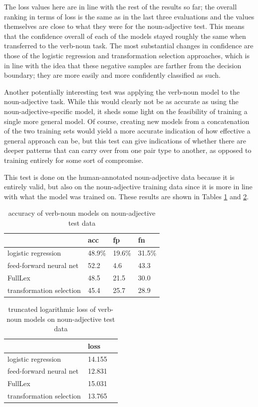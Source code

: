 \documentclass[a4paper, 12pt]{article}
\begin{document}
The loss values here are in line with the rest of the results so far; the overall ranking in terms of loss is the same as in the last three evaluations and the values themselves are close to what they were for the noun-adjective test. This means that the confidence overall of each of the models stayed roughly the same when transferred to the verb-noun task. The most substantial changes in confidence are those of the logistic regression and transformation selection approaches, which is in line with the idea that these negative samples are farther from the decision boundary; they are more easily and more confidently classified as such.

Another potentially interesting test was applying the verb-noun model to the noun-adjective task. While this would clearly not be as accurate as using the noun-adjective-specific model, it sheds some light on the feasibility of training a single more general model. Of course, creating new models from a concatenation of the two training sets would yield a more accurate indication of how effective a general approach can be, but this test can give indications of whether there are deeper patterns that can carry over from one pair type to another, as opposed to training entirely for some sort of compromise.

This test is done on the human-annotated noun-adjective data because it is entirely valid, but also on the noun-adjective training data since it is more in line with what the model was trained on. These results are shown in Tables \ref{accuracy-vn-na} and \ref{loss-vn-na}.

\begin{table}[]
	\centering
	\begin{tabular}{l|lll}
		                         & acc      & fp       & fn        \\ \hline
		logistic regression      & 48.9\%   & 19.6\%   & 31.5\%    \\
		feed-forward neural net  & 52.2     & 4.6      & 43.3      \\
		FullLex                  & 48.5     & 21.5     & 30.0      \\
		transformation selection & 45.4     & 25.7     & 28.9
	\end{tabular}
	\caption{accuracy of verb-noun models on noun-adjective test data}
	\label{accuracy-vn-na}
\end{table}

\begin{table}[]
	\centering
	\begin{tabular}{l|l|l}
		                         & loss      \\ \hline
		logistic regression      & 14.155    \\
		feed-forward neural net  & 12.831    \\
		FullLex                  & 15.031    \\
		transformation selection & 13.765
	\end{tabular}
	\caption{truncated logarithmic loss of verb-noun models on noun-adjective test data}
	\label{loss-vn-na}
\end{table}
\end{document}
